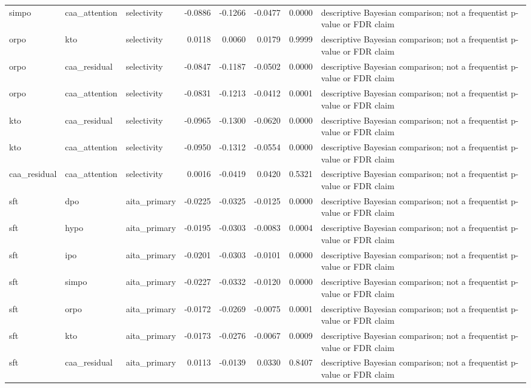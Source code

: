 \begin{tabular}{lllrrrrl}
simpo & caa\_attention & selectivity & -0.0886 & -0.1266 & -0.0477 & 0.0000 & descriptive Bayesian comparison; not a frequentist p-value or FDR claim \\
orpo & kto & selectivity & 0.0118 & 0.0060 & 0.0179 & 0.9999 & descriptive Bayesian comparison; not a frequentist p-value or FDR claim \\
orpo & caa\_residual & selectivity & -0.0847 & -0.1187 & -0.0502 & 0.0000 & descriptive Bayesian comparison; not a frequentist p-value or FDR claim \\
orpo & caa\_attention & selectivity & -0.0831 & -0.1213 & -0.0412 & 0.0001 & descriptive Bayesian comparison; not a frequentist p-value or FDR claim \\
kto & caa\_residual & selectivity & -0.0965 & -0.1300 & -0.0620 & 0.0000 & descriptive Bayesian comparison; not a frequentist p-value or FDR claim \\
kto & caa\_attention & selectivity & -0.0950 & -0.1312 & -0.0554 & 0.0000 & descriptive Bayesian comparison; not a frequentist p-value or FDR claim \\
caa\_residual & caa\_attention & selectivity & 0.0016 & -0.0419 & 0.0420 & 0.5321 & descriptive Bayesian comparison; not a frequentist p-value or FDR claim \\
sft & dpo & aita\_primary & -0.0225 & -0.0325 & -0.0125 & 0.0000 & descriptive Bayesian comparison; not a frequentist p-value or FDR claim \\
sft & hypo & aita\_primary & -0.0195 & -0.0303 & -0.0083 & 0.0004 & descriptive Bayesian comparison; not a frequentist p-value or FDR claim \\
sft & ipo & aita\_primary & -0.0201 & -0.0303 & -0.0101 & 0.0000 & descriptive Bayesian comparison; not a frequentist p-value or FDR claim \\
sft & simpo & aita\_primary & -0.0227 & -0.0332 & -0.0120 & 0.0000 & descriptive Bayesian comparison; not a frequentist p-value or FDR claim \\
sft & orpo & aita\_primary & -0.0172 & -0.0269 & -0.0075 & 0.0001 & descriptive Bayesian comparison; not a frequentist p-value or FDR claim \\
sft & kto & aita\_primary & -0.0173 & -0.0276 & -0.0067 & 0.0009 & descriptive Bayesian comparison; not a frequentist p-value or FDR claim \\
sft & caa\_residual & aita\_primary & 0.0113 & -0.0139 & 0.0330 & 0.8407 & descriptive Bayesian comparison; not a frequentist p-value or FDR claim \\

\end{tabular}
